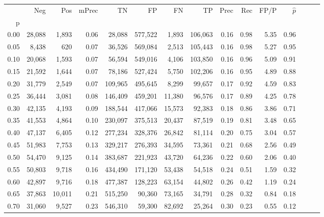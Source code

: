 \begin{tabular}{rrrrrrrrrrrrrrr}
\toprule
{} &     Neg &     Pos & mPrec &       TN &       FP &       FN &       TP &  Prec &   Rec &  FP/P & $\hat{p}$ \\
p    &         &         &       &          &          &          &          &       &       &       &           \\
\midrule
0.00 &  28,088 &   1,893 &  0.06 &   28,088 &  577,522 &    1,893 &  106,063 &  0.16 &  0.98 &  5.35 &      0.96 \\
0.05 &   8,438 &     620 &  0.07 &   36,526 &  569,084 &    2,513 &  105,443 &  0.16 &  0.98 &  5.27 &      0.95 \\
0.10 &  20,068 &   1,593 &  0.07 &   56,594 &  549,016 &    4,106 &  103,850 &  0.16 &  0.96 &  5.09 &      0.91 \\
0.15 &  21,592 &   1,644 &  0.07 &   78,186 &  527,424 &    5,750 &  102,206 &  0.16 &  0.95 &  4.89 &      0.88 \\
0.20 &  31,779 &   2,549 &  0.07 &  109,965 &  495,645 &    8,299 &   99,657 &  0.17 &  0.92 &  4.59 &      0.83 \\
0.25 &  36,444 &   3,081 &  0.08 &  146,409 &  459,201 &   11,380 &   96,576 &  0.17 &  0.89 &  4.25 &      0.78 \\
0.30 &  42,135 &   4,193 &  0.09 &  188,544 &  417,066 &   15,573 &   92,383 &  0.18 &  0.86 &  3.86 &      0.71 \\
0.35 &  41,553 &   4,864 &  0.10 &  230,097 &  375,513 &   20,437 &   87,519 &  0.19 &  0.81 &  3.48 &      0.65 \\
0.40 &  47,137 &   6,405 &  0.12 &  277,234 &  328,376 &   26,842 &   81,114 &  0.20 &  0.75 &  3.04 &      0.57 \\
0.45 &  51,983 &   7,753 &  0.13 &  329,217 &  276,393 &   34,595 &   73,361 &  0.21 &  0.68 &  2.56 &      0.49 \\
0.50 &  54,470 &   9,125 &  0.14 &  383,687 &  221,923 &   43,720 &   64,236 &  0.22 &  0.60 &  2.06 &      0.40 \\
0.55 &  50,803 &   9,718 &  0.16 &  434,490 &  171,120 &   53,438 &   54,518 &  0.24 &  0.51 &  1.59 &      0.32 \\
0.60 &  42,897 &   9,716 &  0.18 &  477,387 &  128,223 &   63,154 &   44,802 &  0.26 &  0.42 &  1.19 &      0.24 \\
0.65 &  37,863 &  10,011 &  0.21 &  515,250 &   90,360 &   73,165 &   34,791 &  0.28 &  0.32 &  0.84 &      0.18 \\
0.70 &  31,060 &   9,527 &  0.23 &  546,310 &   59,300 &   82,692 &   25,264 &  0.30 &  0.23 &  0.55 &      0.12 \\

\end{tabular}
